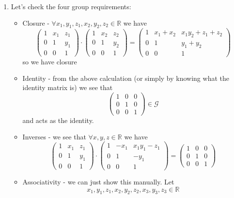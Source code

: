 \documentclass{article}
\newcommand{\chapternumber}{2}
\newenvironment{QandA}{\begin{enumerate}[label=\chapternumber.\arabic*]\bfseries\boldmath}
	{\end{enumerate}}
\newenvironment{answered}{\par\bigskip\normalfont\unboldmath}{}
\begin{document}
\begin{QandA}
		\item
		\begin{answered}
			Let's check the four group requirements:
			\begin{itemize}
				\item Closure - $\forall x_1,y_1,z_1,x_2,y_2,z_2\in\mathbb{R}$ we have
				\[
				\begin{pmatrix}
					1 & x_1 & z_1 \\ 0 & 1 & y_1 \\ 0 & 0 & 1
				\end{pmatrix}
				\cdot
				\begin{pmatrix}
					1 & x_2 & z_2 \\ 0 & 1 & y_2 \\ 0 & 0 & 1
				\end{pmatrix}
				=
				\begin{pmatrix}
					1 & x_1+x_2 & x_1y_2+z_1+z_2 \\ 0 & 1 & y_1+y_2 \\ 0 & 0 & 1
				\end{pmatrix}
				\]
				so we have closure
				\item Identity - from the above calculation (or simply by knowing what the identity matrix is) we see that 
				\[
				\begin{pmatrix}
					1 & 0 & 0 \\ 0 & 1 & 0 \\ 0 & 0 & 1
				\end{pmatrix}
				\in
				\mathcal{G}\]
				and acts as the identity.
				\item Inverses - we see that $\forall x,y,z\in\mathbb{R}$ we have
				\[
				\begin{pmatrix}
					1 & x_1 & z_1 \\ 0 & 1 & y_1 \\ 0 & 0 & 1
				\end{pmatrix}
				\cdot
				\begin{pmatrix}
					1 & -x_1 & x_1y_1-z_1 \\ 0 & 1 & -y_1 \\ 0 & 0 & 1
				\end{pmatrix}
				=
				\begin{pmatrix}
					1 & 0 & 0 \\ 0 & 1 & 0 \\ 0 & 0 & 1
				\end{pmatrix}
				\]
				\item Associativity - we can just show this manually. Let
				\[x_1,y_1,z_1,x_2,y_2,z_2,x_3,y_3,z_3\in\mathbb{R}\]

\end{itemize}
\end{answered}
\end{QandA}
\end{document}
